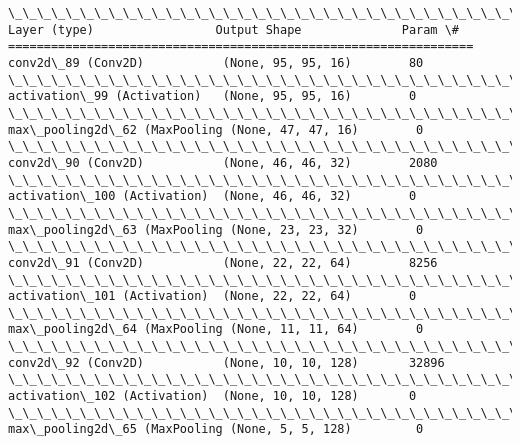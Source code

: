 \documentclass[11pt]{article}
\begin{document}
    \begin{Verbatim}[commandchars=\\\{\}]
\_\_\_\_\_\_\_\_\_\_\_\_\_\_\_\_\_\_\_\_\_\_\_\_\_\_\_\_\_\_\_\_\_\_\_\_\_\_\_\_\_\_\_\_\_\_\_\_\_\_\_\_\_\_\_\_\_\_\_\_\_\_\_\_\_
Layer (type)                 Output Shape              Param \#   
=================================================================
conv2d\_89 (Conv2D)           (None, 95, 95, 16)        80        
\_\_\_\_\_\_\_\_\_\_\_\_\_\_\_\_\_\_\_\_\_\_\_\_\_\_\_\_\_\_\_\_\_\_\_\_\_\_\_\_\_\_\_\_\_\_\_\_\_\_\_\_\_\_\_\_\_\_\_\_\_\_\_\_\_
activation\_99 (Activation)   (None, 95, 95, 16)        0         
\_\_\_\_\_\_\_\_\_\_\_\_\_\_\_\_\_\_\_\_\_\_\_\_\_\_\_\_\_\_\_\_\_\_\_\_\_\_\_\_\_\_\_\_\_\_\_\_\_\_\_\_\_\_\_\_\_\_\_\_\_\_\_\_\_
max\_pooling2d\_62 (MaxPooling (None, 47, 47, 16)        0         
\_\_\_\_\_\_\_\_\_\_\_\_\_\_\_\_\_\_\_\_\_\_\_\_\_\_\_\_\_\_\_\_\_\_\_\_\_\_\_\_\_\_\_\_\_\_\_\_\_\_\_\_\_\_\_\_\_\_\_\_\_\_\_\_\_
conv2d\_90 (Conv2D)           (None, 46, 46, 32)        2080      
\_\_\_\_\_\_\_\_\_\_\_\_\_\_\_\_\_\_\_\_\_\_\_\_\_\_\_\_\_\_\_\_\_\_\_\_\_\_\_\_\_\_\_\_\_\_\_\_\_\_\_\_\_\_\_\_\_\_\_\_\_\_\_\_\_
activation\_100 (Activation)  (None, 46, 46, 32)        0         
\_\_\_\_\_\_\_\_\_\_\_\_\_\_\_\_\_\_\_\_\_\_\_\_\_\_\_\_\_\_\_\_\_\_\_\_\_\_\_\_\_\_\_\_\_\_\_\_\_\_\_\_\_\_\_\_\_\_\_\_\_\_\_\_\_
max\_pooling2d\_63 (MaxPooling (None, 23, 23, 32)        0         
\_\_\_\_\_\_\_\_\_\_\_\_\_\_\_\_\_\_\_\_\_\_\_\_\_\_\_\_\_\_\_\_\_\_\_\_\_\_\_\_\_\_\_\_\_\_\_\_\_\_\_\_\_\_\_\_\_\_\_\_\_\_\_\_\_
conv2d\_91 (Conv2D)           (None, 22, 22, 64)        8256      
\_\_\_\_\_\_\_\_\_\_\_\_\_\_\_\_\_\_\_\_\_\_\_\_\_\_\_\_\_\_\_\_\_\_\_\_\_\_\_\_\_\_\_\_\_\_\_\_\_\_\_\_\_\_\_\_\_\_\_\_\_\_\_\_\_
activation\_101 (Activation)  (None, 22, 22, 64)        0         
\_\_\_\_\_\_\_\_\_\_\_\_\_\_\_\_\_\_\_\_\_\_\_\_\_\_\_\_\_\_\_\_\_\_\_\_\_\_\_\_\_\_\_\_\_\_\_\_\_\_\_\_\_\_\_\_\_\_\_\_\_\_\_\_\_
max\_pooling2d\_64 (MaxPooling (None, 11, 11, 64)        0         
\_\_\_\_\_\_\_\_\_\_\_\_\_\_\_\_\_\_\_\_\_\_\_\_\_\_\_\_\_\_\_\_\_\_\_\_\_\_\_\_\_\_\_\_\_\_\_\_\_\_\_\_\_\_\_\_\_\_\_\_\_\_\_\_\_
conv2d\_92 (Conv2D)           (None, 10, 10, 128)       32896     
\_\_\_\_\_\_\_\_\_\_\_\_\_\_\_\_\_\_\_\_\_\_\_\_\_\_\_\_\_\_\_\_\_\_\_\_\_\_\_\_\_\_\_\_\_\_\_\_\_\_\_\_\_\_\_\_\_\_\_\_\_\_\_\_\_
activation\_102 (Activation)  (None, 10, 10, 128)       0         
\_\_\_\_\_\_\_\_\_\_\_\_\_\_\_\_\_\_\_\_\_\_\_\_\_\_\_\_\_\_\_\_\_\_\_\_\_\_\_\_\_\_\_\_\_\_\_\_\_\_\_\_\_\_\_\_\_\_\_\_\_\_\_\_\_
max\_pooling2d\_65 (MaxPooling (None, 5, 5, 128)         0         

\end{Verbatim}
\end{document}

